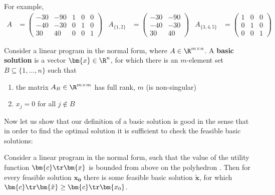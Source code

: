 \noindent
For example,
\begin{align*}
A&=\left(\begin{array}{ccccc}-30&-90&1&0&0\\-40&-30&0&1&0\\30&40&0&0&1\end{array}\right)
 &A_{\{1,2\}}&=\left(\begin{array}{ccccc}-30&-90\\-40&-30\\30&40\end{array}\right)
 &A_{\{3,4,5\}}&=\left(\begin{array}{ccccc}1&0&0\\0&1&0\\0&0&1\end{array}\right)
\end{align*}


\begin{framed} 
  \begin{dfn} 
    \label{dfn:LP:basis} 
    Consider a linear program in the normal form, where
    $A\in\R^{m\times n}$.
    A {\bfseries basic solution} is a vector  $\bm{x}\in\R^n$, 
    for which there is an $m$-element set
    $B\subseteq\{1,\ldots,n\}$ such that
    \begin{enumerate}
      \item the matrix $A_B\in\R^{m\times m}$ has full rank, $m$ (\ie is non-singular)
      \item $x_j=0$ for all $j\not\in B$
    \end{enumerate}
  \end{dfn}
\end{framed}

\noindent 
Now let us show that our definition of a basic solution is good in the sense that
in order to find the optimal solution it is sufficient to check the feasible basic
solutions:


\begin{veta}
Consider a linear program in the normal form, such that the 
value of the utility function  $\bm{c}\tr\bm{x}$ is bounded from
above on the polyhedron \dom. Then for every feasible solution $\bm{x_0}$
there is some feasible basic solution $\bm{\tilde{x}}$,
for which
$\bm{c}\tr\bm{\tilde{x}}\ge\bm{c}\tr\bm{x_0}$.
\end{veta}

